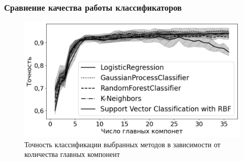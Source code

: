 \documentclass{beamer}
\begin{document}
\begin{frame}
\frametitle{Сравнение качества работы классификаторов}
\begin{figure}[H]
 \centering
 \includegraphics[scale = 0.4]{Accuracy.pdf}
 \caption{Точность классификации выбранных методов в зависимости от количества главных компонент}
\end{figure}


\end{frame}
\end{document}

